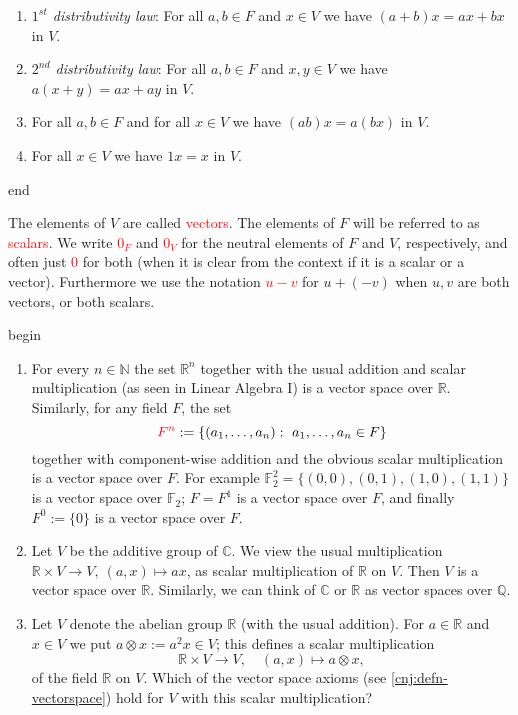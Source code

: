 \documentclass[
  12pt,
  a4paper,
  twoside]{article}
\providecommand{\tightlist}{%
  \setlength{\itemsep}{0pt}\setlength{\parskip}{0pt}}
\theoremstyle{plain}
\theoremstyle{definition}
\begin{document}
\begin{enumerate}
\def\labelenumi{(\roman{enumi})}
\tightlist
\item
  \emph{\(1^{st}\) distributivity law}: For all \(a,b \in F\) and \(x \in V\) we have \((a + b)x = ax + bx\) in \(V\).
\item
  \emph{\(2^{nd}\) distributivity law}: For all \(a,b \in F\) and \(x,y \in V\) we have \(a(x + y) = ax + ay\) in \(V\).
\item
  For all \(a, b \in F\) and for all \(x \in V\) we have \((ab)x = a(bx)\) in \(V\).
\item
  For all \(x \in V\) we have \(1x = x\) in \(V\).
\end{enumerate}

\csname end

The elements of \(V\) are called \textcolor{red}{vectors}. The elements of \(F\) will be referred to as \textcolor{red}{scalars}. We write \textcolor{red}{$0_F$} and \textcolor{red}{$0_{V}$} for the neutral elements of \(F\) and \(V\), respectively, and often just \textcolor{red}{$0$} for both (when it is clear from the context if it is a scalar or a vector). Furthermore we use the notation \textcolor{red}{$u-v$} for \(u + (-v)\) when \(u,v\) are both vectors, or both scalars.

\csname begin\label{cnj:expl-vectspaces}

\begin{enumerate}
\def\labelenumi{(\alph{enumi})}
\item
  For every \(n \in \mathbb{N}\) the set \(\mathbb{R}^{n}\) together with the usual addition and scalar multiplication (as seen in Linear Algebra I) is a vector space over \(\mathbb{R}\).
  Similarly, for any field \(F\), the set \[ {\color{red}{F^n}} := \{ (a_{1}, \dots ,a_{n}) : \ a_{1}, \dots ,a_{n} \in F \} \] together with component-wise addition and the obvious scalar multiplication is a vector space over \(F\).
  For example \(\mathbb{F}_{2}^{2} = \{ (0,0),(0,1),(1,0),(1,1) \}\) is a vector space over \(\mathbb{F}_{2}\);
  \(F=F^{1}\) is a vector space over \(F\), and finally \(F^0:=\{ 0 \}\) is a vector space over \(F\).
\item
  Let \(V\) be the additive group of \(\mathbb{C}\).
  We view the usual multiplication \(\mathbb{R} \times V \to V, \ (a,x) \mapsto ax\), as scalar multiplication of \(\mathbb{R}\) on \(V\).
  Then \(V\) is a vector space over \(\mathbb{R}\). Similarly, we can think of \(\mathbb{C}\) or \(\mathbb{R}\) as vector spaces over \(\mathbb{Q}\).
\item
  Let \(V\) denote the abelian group \(\mathbb{R}\) (with the usual addition).
  For \(a \in \mathbb{R}\) and \(x \in V\) we put \(a \otimes x := a^{2}x \in V\); this defines a scalar multiplication \[ \mathbb{R} \times V \to V,\quad (a,x) \mapsto a \otimes x, \] of the field \(\mathbb{R}\) on \(V\).
  Which of the vector space axioms (see \ref{cnj:defn-vectorspace}) hold for \(V\) with this scalar multiplication?
\end{enumerate}
\end{document}
